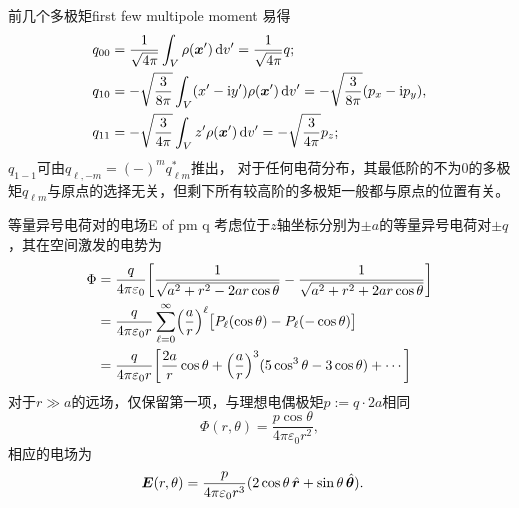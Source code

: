\begin{example}{前几个多极矩}{first few multipole moment}
    易得
    \begin{equation*}
        \begin{aligned}
            q_{00}&=\frac1{\sqrt{4\pi}}\int_V\rho(\bm x')\mathop{}\!\mathrm{d} v'=\frac1{\sqrt{4\pi}}q;\\
            q_{10}&=-\sqrt{\frac3{8\pi}}\int_V(x'-\mathrm{i} y')\rho(\bm x')\mathop{}\!\mathrm{d} v'=-\sqrt{\frac3{8\pi}}(p_x-\mathrm{i} p_y),\\
            q_{11}&=-\sqrt{\frac3{4\pi}}\int_V z'\rho(\bm x')\mathop{}\!\mathrm{d} v'=-\sqrt{\frac3{4\pi}}p_z;
        \end{aligned}
    \end{equation*}
    $q_{1-1}$可由$q_{\ell,-m}=(-)^mq_{\ell m}^\ast$推出，
    \tcblower
    对于任何电荷分布，其最低阶的不为0的多极矩$q_{\ell m}$与原点的选择无关，但剩下所有较高阶的多极矩一般都与原点的位置有关。
\end{example}
\iffalse
由式\eqref{eqn:Phi multipole}，电场分量可被表示为
\begin{align*}
    E_r&=-\pv\Phi r=\frac1{\varepsilon_0}\frac{\ell+1}{2\ell+1}q_{\ell m}\frac{Y_{\ell m}(\theta,\phi)}{r^{\ell+2}},\\
    E_\theta&=-\frac1r\pv\Phi\theta=-\frac1{\varepsilon_0}\frac{1}{2\ell+1}q_{\ell m}\frac1{r^{\ell+2}}\pv{Y_{\ell m}(\theta,\phi)}\theta,\\
    E_\phi&=-\frac1{r\sin\theta}\pv\Phi\phi=-\i\frac1{\varepsilon_0}\frac{1}{2\ell+1}q_{\ell m}\frac1{r^{\ell+2}}\frac{m}{\sin\theta}{Y_{\ell m}(\theta,\phi)},
\end{align*}
\fi
\begin{example}{等量异号电荷对的电场}{E of pm q}
    考虑位于$z$轴坐标分别为$\pm a$的等量异号电荷对$\pm q$，其在空间激发的电势为
    \begin{align*}
        \Phi&=\frac q{4\pi\varepsilon_0}\biggl[\frac1{\sqrt{a^2+r^2-2ar\cos\theta}}-\frac1{\sqrt{a^2+r^2+2ar\cos\theta}}\biggr]\\
        &=\frac q{4\pi\varepsilon_0r}\sum_{\ell=0}^\infty\Bigl(\frac ar\Bigr)^\ell\bigl[P_{\ell}(\cos\theta)-P_\ell(-\cos\theta)\bigr]\\
        &=\frac q{4\pi\varepsilon_0r}\biggl[\frac{2a}r\cos\theta+\Bigl(\frac ar\Bigr)^3(5\cos^3\theta-3\cos\theta)+\cdots\biggr]
    \end{align*}
    对于$r\gg a$的远场，仅保留第一项，与理想电偶极矩$p:=q\cdot 2a$相同
    \begin{equation}
        \label{eqn:edipole-Phi}
        \Phi(r,\theta)=\frac{p\cos\theta}{4\pi\varepsilon_0r^2},
    \end{equation}
    相应的电场为
    \begin{align}
        \label{eqn:edipole-E}
        \bm E(r,\theta)&=\frac{p}{4\pi\varepsilon_0r^3}(2\cos\theta\mathop{}\!\hat{\bm{r}}+\sin\theta\mathop{}\!\hat{\bm{\theta}}).
    \end{align}
\end{example}

